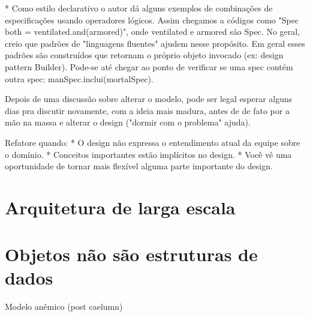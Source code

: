 \documentclass[a4paper, 12pt]{article}
\begin{document}
* Como estilo declarativo o autor dá alguns exemplos de combinações de especificações usando operadores lógicos. Assim chegamos a códigos como "Spec both = ventilated.and(armored)", onde ventilated e armored são Spec. No geral, creio que padrões de "linguagens fluentes" ajudem nesse propósito. Em geral esses padrões são construídos que retornam o próprio objeto invocado (ex: design pattern Builder). Pode-se até chegar ao ponto de verificar se uma spec contém outra spec: manSpec.inclui(mortalSpec).

Depois de uma discussão sobre alterar o modelo, pode ser legal esperar alguns dias pra discutir novamente, com a ideia mais madura, antes de de fato por a mão na massa e alterar o design ("dormir com o problema" ajuda).

Refatore quando:
* O design não expressa o entendimento atual da equipe sobre o domínio.
* Conceitos importantes estão implícitos no design.
* Você vê uma oportunidade de tornar mais flexível alguma parte importante do design.

\section{Arquitetura de larga escala}

\section{Objetos não são estruturas de dados}

Modelo anêmico (post caelumn)
\end{document}
